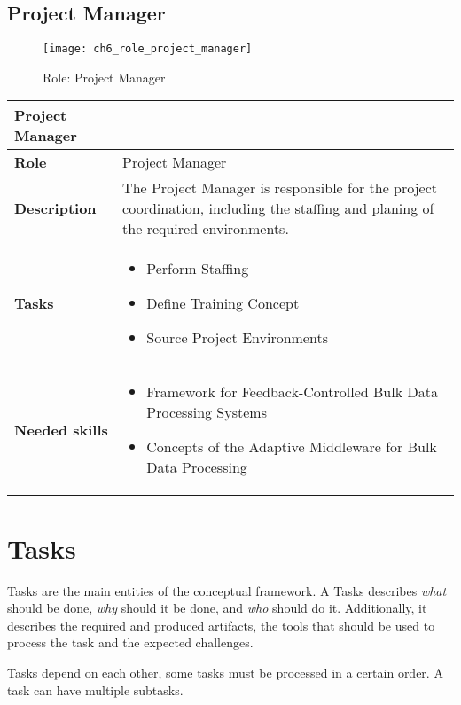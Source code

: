 \subsection{Project Manager}

\begin{figure}[htpb] \centering 
	\texttt{[image: ch6\_role\_project\_manager]} 
	\caption{Role: Project Manager} 
	\label{fig:ch6_role_project_manager} 
\end{figure}

\begin{tabularx}{\textwidth}{@{} l X @{}}
	\caption{table}{Project Manager} \label{table:ch6_Role_Project_Manager}\\
	\toprule
	\bfseries Role & Project Manager\\
	\midrule
	\bfseries Description & The Project Manager is responsible for the project coordination, including the staffing and planing of the required environments.\\
	\midrule
	\bfseries Tasks & 
	\begin{itemize}
		\item Perform Staffing
		\item Define Training Concept
		\item Source Project Environments
	\end{itemize}
	\\
	\midrule 
	\bfseries Needed skills &
	\begin{itemize}
		\item Framework for Feedback-Controlled Bulk Data Processing Systems
		\item Concepts of the Adaptive Middleware for Bulk Data Processing
	\end{itemize}
	\\
	\bottomrule
\end{tabularx}


\section{Tasks}
\label{sec:ch6_tasks}

Tasks are the main entities of the conceptual framework. A Tasks describes \emph{what} should be done, \emph{why} should it be done, and \emph{who} should do it.
Additionally, it describes the required and produced artifacts, the tools that should be used to process the task and the expected challenges.

Tasks depend on each other, some tasks must be processed in a certain order. A task can have multiple subtasks.

